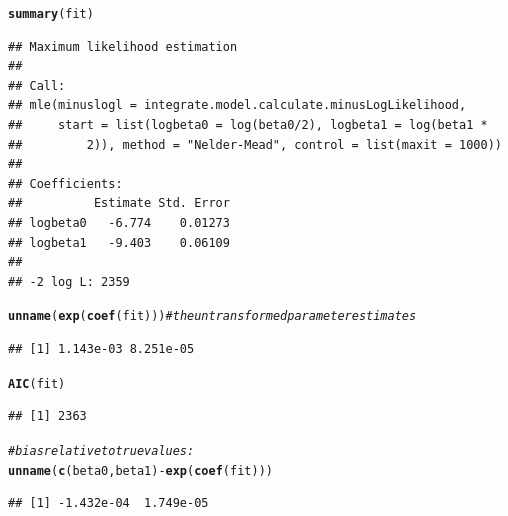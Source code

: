 \documentclass[english]{article}\usepackage[]{graphicx}\usepackage[]{color}
\makeatletter
\newcommand{\hlcom}[1]{\textcolor[rgb]{0.678,0.584,0.686}{\textit{#1}}}%
\newcommand{\hlopt}[1]{\textcolor[rgb]{0,0,0}{#1}}%
\newcommand{\hlstd}[1]{\textcolor[rgb]{0.345,0.345,0.345}{#1}}%
\newcommand{\hlkwd}[1]{\textcolor[rgb]{0.737,0.353,0.396}{\textbf{#1}}}%
\newenvironment{kframe}{%
 \def\at@end@of@kframe{}%
 \ifinner\ifhmode%
  \def\at@end@of@kframe{\end{minipage}}%
  \begin{minipage}{\columnwidth}%
 \fi\fi%
 \def\FrameCommand##1{\hskip\@totalleftmargin \hskip-\fboxsep
 \colorbox{shadecolor}{##1}\hskip-\fboxsep
     \hskip-\linewidth \hskip-\@totalleftmargin \hskip\columnwidth}%
 \MakeFramed {\advance\hsize-\width
   \@totalleftmargin\z@ \linewidth\hsize
   \@setminipage}}%
 {\par\unskip\endMakeFramed%
 \at@end@of@kframe}
\newenvironment{knitrout}{}{} %
\makeatother
\begin{document}
\begin{knitrout}
\color{fgcolor}\begin{kframe}
\begin{alltt}
\hlkwd{summary}\hlstd{(fit)}
\end{alltt}
\begin{verbatim}
## Maximum likelihood estimation
## 
## Call:
## mle(minuslogl = integrate.model.calculate.minusLogLikelihood, 
##     start = list(logbeta0 = log(beta0/2), logbeta1 = log(beta1 * 
##         2)), method = "Nelder-Mead", control = list(maxit = 1000))
## 
## Coefficients:
##          Estimate Std. Error
## logbeta0   -6.774    0.01273
## logbeta1   -9.403    0.06109
## 
## -2 log L: 2359
\end{verbatim}
\begin{alltt}
\hlkwd{unname}\hlstd{(}\hlkwd{exp}\hlstd{(}\hlkwd{coef}\hlstd{(fit)))}  \hlcom{# the untransformed parameter estimates}
\end{alltt}
\begin{verbatim}
## [1] 1.143e-03 8.251e-05
\end{verbatim}
\begin{alltt}
\hlkwd{AIC}\hlstd{(fit)}
\end{alltt}
\begin{verbatim}
## [1] 2363
\end{verbatim}
\begin{alltt}
\hlcom{# bias relative to true values:}
\hlkwd{unname}\hlstd{(}\hlkwd{c}\hlstd{(beta0, beta1)} \hlopt{-} \hlkwd{exp}\hlstd{(}\hlkwd{coef}\hlstd{(fit)))}
\end{alltt}
\begin{verbatim}
## [1] -1.432e-04  1.749e-05
\end{verbatim}
\end{kframe}
\end{knitrout}


\end{document}

